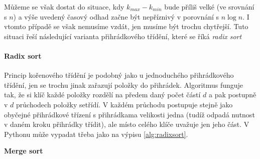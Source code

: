 Můžeme se však dostat do situace, kdy $k_{max}-k_{min}$ bude příliš velké (ve srovnání s $n$) a výše uvedený časový odhad začne být nepříznivý v porovnání s $n\log n$.
I vtomto případě se však nemusíme vzdát, jen musíme být trochu chytřejší. Tuto situaci
řeší následující varianta přihrádkového třídění, které se říká \emph{radix sort}

\paragraph{Radix sort} Princip kořenového třídění je podobný jako u jednoduchého
přihrádkového třídění, jen se trochu jinak zařazují položky do přihrádek. Algoritmus funguje tak, že si klíč každé položky rozdělí na předem daný počet částí $d$ a pak
postupně v $d$ průchodech položky setřídí. V každém průchodu postupuje stejně jako
obyčejné přihrádkové třízení s přihrádkama velikosti jedna (tudíž odpadá
nutnost v daném kroku přihrádky třídit), ale místo celého klíče uvažuje jen jeho část. V Pythonu může vypadat třeba jako na výpisu \ref{alg:radixsort}.


\begin{todo}
{\bf Merge sort}

\end{todo}

\ifx\ucebnice\undefined

\fi
